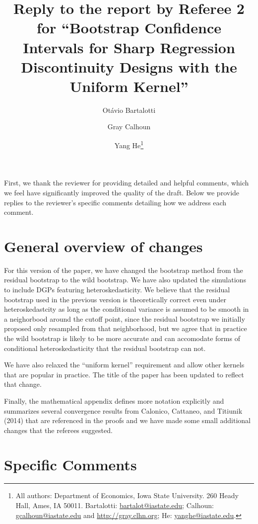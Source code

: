 \documentclass[12pt,fleqn]{article}
\title{Reply to the report by Referee 2 for ``Bootstrap Confidence Intervals for Sharp Regression Discontinuity Designs
  with the Uniform Kernel''}
\author{Ot\'avio Bartalotti \and Gray Calhoun \and Yang He\thanks{%
  All authors: Department of Economics, Iowa State University.
  260 Heady Hall, Ames, IA 50011.
  Bartalotti: \protect\url{bartalot@iastate.edu};
  Calhoun: \protect\url{gcalhoun@iastate.edu} and
  \protect\url{http://gray.clhn.org};
  He: \protect\url{yanghe@iastate.edu}.}}
\begin{document}
\maketitle

First, we thank the reviewer for providing detailed and helpful comments, which
we feel have significantly improved the quality of the draft.  Below we provide
replies to the reviewer's specific comments detailing how we address each
comment.

\section{General overview of changes}

For this version of the paper, we have changed the bootstrap method from the
residual bootstrap to the wild bootstrap. We have also updated the simulations
to include DGPs featuring heteroskedasticity. We believe that the residual
bootstrap used in the previous version is theoretically correct even under
heteroskedastcity as long as the conditional variance is assumed to be smooth in
a neighorbood around the cutoff point, since the residual bootstrap we initially
proposed only resampled from that neighborhood, but we agree that in practice
the wild bootstrap is likely to be more accurate and can accomodate forms of
conditional heteroskedasticity that the residual bootstrap can not.

We have also relaxed the ``uniform kernel'' requirement and allow other kernels
that are popular in practice. The title of the paper has been updated to reflect
that change.

Finally, the mathematical appendix defines more notation explicitly and
summarizes several convergence results from Calonico, Cattaneo, and Titiunik
(2014) that are referenced in the proofs and we have made some small additional
changes that the referees suggested.

\section{Specific Comments}
\end{document}
